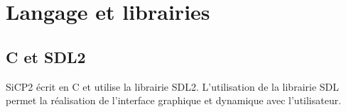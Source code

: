 %
\section{Langage et librairies}
%
%
\subsection{C et SDL2}
%
SiCP2 écrit en C \cite{guide-C} \cite{langage-C} et utilise la librairie SDL2. L'utilisation de la librairie SDL permet la réalisation de l'interface graphique et dynamique avec l'utilisateur.
%
%
